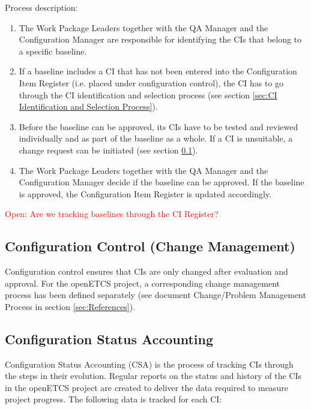 \documentclass{template/openetcs_article}
\begin{document}
Process description:

\vspace{-10pt}
\begin{enumerate}
\item The Work Package Leaders together with the QA Manager and the Configuration Manager are responsible for identifying the CIs that belong to a specific baseline.
\item If a baseline includes a CI that has not been entered into the Configuration Item Register (i.e. placed under configuration control), the CI has to go through the CI identification and selection process (see section \ref{sec:CI Identification and Selection Process}).
\item Before the baseline can be approved, its CIs have to be tested and reviewed individually and as part of the baseline as a whole. If a CI is unsuitable, a change request can be initiated (see section \ref{sec:Configuration Control (Change Management)}).
\item The Work Package Leaders together with the QA Manager and the Configuration Manager decide if the baseline can be approved. If the baseline is approved, the Configuration Item Register is updated accordingly.
\end{enumerate}

\textcolor{red}{Open: Are we tracking baselines through the CI Register?}


\subsection{Configuration Control (Change Management)} %
\label{sec:Configuration Control (Change Management)}

Configuration control ensures that CIs are only changed after evaluation and approval. For the openETCS project, a corresponding change management process has been defined separately (see document Change/Problem Management Process in section \ref{sec:References}).


\subsection{Configuration Status Accounting} %
\label{sec:Configuration Status Accounting}

Configuration Status Accounting (CSA) is the process of tracking CIs through the steps in their evolution. Regular reports on the status and history of the CIs in the openETCS project are created to deliver the data required to measure project progress. The following data is tracked for each CI:
\end{document}

